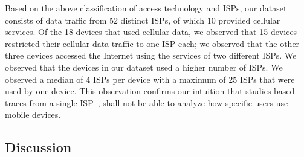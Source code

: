 
Based on the above classification of access technology and ISPs, our dataset consists of data traffic from 52 distinct ISPs, of which 10 provided cellular services.
Of the 18 devices that used cellular data, we observed that 15 devices restricted their cellular data traffic to one ISP each; we observed that the other three devices accessed the Internet using the services of two different ISPs.
We observed that the devices in our dataset used a higher number of \wifi ISPs.
We observed a median of 4 \wifi ISPs per device with a maximum of 25 \wifi ISPs that were used by one device.
This observation confirms our intuition that studies based traces from a single ISP~\cite{maier:mobtraffic, vallina-rod:ads}, shall not be able to analyze how specific users use mobile devices. 

\subsection{Discussion}

